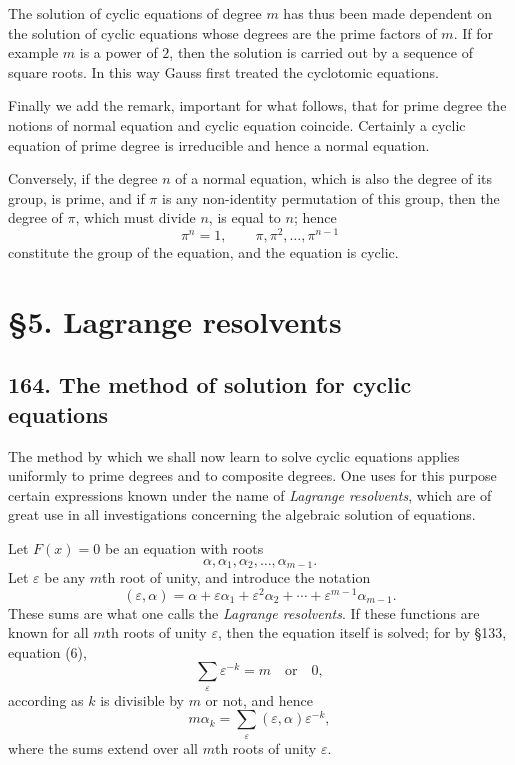 \documentclass[11pt,a4paper]{book}
\begin{document}
The solution of cyclic equations of degree $m$ has thus been made dependent on the solution of cyclic equations whose degrees are the prime factors of $m$. If for example $m$ is a power of $2$, then the solution is carried out by a sequence of square roots. In this way Gauss first treated the cyclotomic equations.

Finally we add the remark, important for what follows, that for prime degree the notions of normal equation and cyclic equation coincide. Certainly a cyclic equation of prime degree is irreducible and hence a normal equation.

Conversely, if the degree $n$ of a normal equation, which is also the degree of its group, is prime, and if $\pi$ is any non-identity permutation of this group, then the degree of $\pi$, which must divide $n$, is equal to $n$; hence
\[
\pi^n=1,\qquad \pi,\pi^2,\dots,\pi^{n-1}
\]
constitute the group of the equation, and the equation is cyclic.

\section*{\S 5. Lagrange resolvents}

\subsection*{164. The method of solution for cyclic equations}

The method by which we shall now learn to solve cyclic equations applies uniformly to prime degrees and to composite degrees. One uses for this purpose certain expressions known under the name of \emph{Lagrange resolvents}, which are of great use in all investigations concerning the algebraic solution of equations.

Let $F(x)=0$ be an equation with roots
\[
\alpha,\alpha_1,\alpha_2,\dots,\alpha_{m-1}.
\]
Let $\varepsilon$ be any $m$th root of unity, and introduce the notation
\[
(\varepsilon,\alpha)=\alpha+\varepsilon\alpha_1+\varepsilon^2\alpha_2+\cdots+\varepsilon^{m-1}\alpha_{m-1}.
\tag{1}
\]
These sums are what one calls the \emph{Lagrange resolvents}. If these functions are known for all $m$th roots of unity $\varepsilon$, then the equation itself is solved; for by \S 133, equation (6),
\[
\sum_{\varepsilon}\varepsilon^{-k}=m \quad\text{or}\quad 0,
\tag{2}
\]
according as $k$ is divisible by $m$ or not, and hence
\[
m\alpha_k=\sum_{\varepsilon}(\varepsilon,\alpha)\varepsilon^{-k},
\tag{3}
\]
where the sums extend over all $m$th roots of unity $\varepsilon$.
\end{document}
